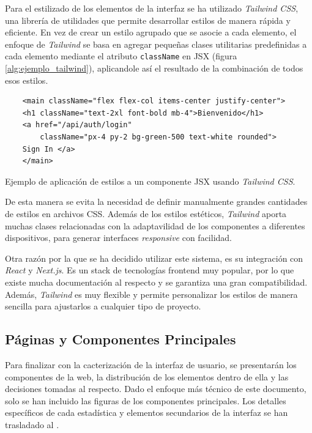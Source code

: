Para el estilizado de los elementos de la interfaz se ha utilizado \textit{Tailwind CSS}, una librería de utilidades que permite desarrollar estilos de manera rápida y eficiente. En vez de crear un estilo agrupado que se asocie a cada elemento, el enfoque de \textit{Tailwind} se basa en agregar pequeñas clases utilitarias predefinidas a cada elemento mediante el atributo \texttt{className} en JSX (figura \ref{alg:ejemplo_tailwind}), aplicandole así el resultado de la combinación de todos esos estilos.

\setlength{\intextsep}{15pt} %
\setlength{\abovecaptionskip}{0pt} %
\setlength{\belowcaptionskip}{0pt} %

\begin{ifalgorithm}[H]
    \begin{lstlisting}
    <main className="flex flex-col items-center justify-center">
    <h1 className="text-2xl font-bold mb-4">Bienvenido</h1>
    <a href="/api/auth/login"
        className="px-4 py-2 bg-green-500 text-white rounded">
    Sign In </a>
    </main>
    \end{lstlisting}
    \caption{Ejemplo de aplicación de estilos a un componente JSX usando \textit{Tailwind CSS}.}
    \label{alg:ejemplo_tailwind}
\end{ifalgorithm}

De esta manera se evita la necesidad de definir manualmente grandes cantidades de estilos en archivos CSS. Además de los estilos estéticos, \textit{Tailwind} aporta muchas clases relacionadas con la adaptavilidad de los componentes a diferentes dispositivos, para generar interfaces \textit{responsive} con facilidad.

Otra razón por la que se ha decidido utilizar este sistema, es su integración con \textit{React} y \textit{Next.js}. Es un stack de tecnologías frontend muy popular, por lo que existe mucha documentación al respecto y se garantiza una gran compatibilidad. Además, \textit{Tailwind} es muy flexible y permite personalizar los estilos de manera sencilla para ajustarlos a cualquier tipo de proyecto.

\subsection{Páginas y Componentes Principales}

Para finalizar con la cacterización de la interfaz de usuario, se presentarán los componentes de la web, la distribución de los elementos dentro de ella y las decisiones tomadas al respecto. Dado el enfoque más técnico de este documento, solo se han incluido las figuras de los componentes principales. Los detalles específicos de cada estadística y elementos secundarios de la interfaz se han trasladado al .

